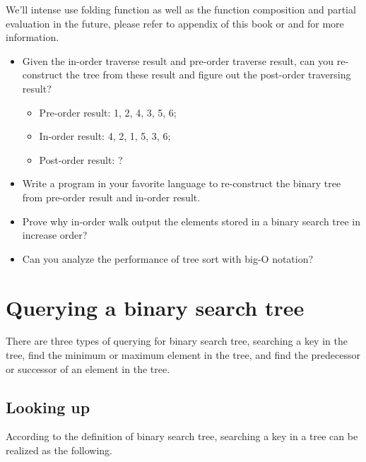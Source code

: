 \documentclass{article}
\begin{document}
We'll intense use folding function as well as the function composition
and partial evaluation in the future, please refer to appendix of this
book or \cite{wiki-fold}
\cite{func-composition} and \cite{curry} for more information.

\begin{Exercise}

\begin{itemize}
\item Given the in-order traverse result and pre-order traverse result,
can you re-construct the tree from these result and figure out the
post-order traversing result?

\begin{itemize}
\item Pre-order result: 1, 2, 4, 3, 5, 6;
\item In-order result: 4, 2, 1, 5, 3, 6;
\item Post-order result: ?
\end{itemize}

\item Write a program in your favorite language to re-construct
the binary tree from pre-order result and in-order result.

\item Prove why in-order walk output the elements stored in a binary
search tree in increase order?

\item Can you analyze the performance of tree sort with big-O notation?
\end{itemize}
\end{Exercise}

\section{Querying a binary search tree}

There are three types of querying for binary search tree, searching
a key in the tree, find the minimum or maximum element in the tree,
and find the predecessor or successor of an element in the tree.

\subsection{Looking up}
According to the definition of binary search tree, searching
a key in a tree can be realized as the following.
\end{document}
